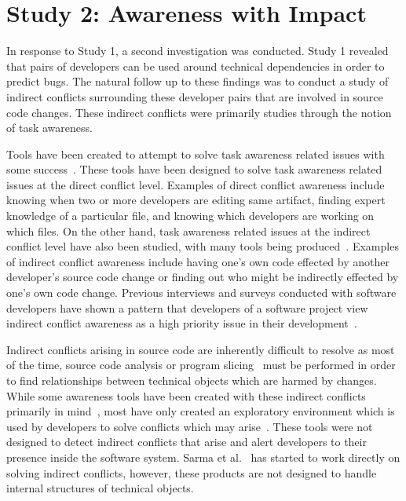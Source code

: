 \section{Study 2: Awareness with Impact}
\label{study:impact}

In response to Study 1, a second investigation was conducted. Study 1 revealed
that pairs of developers can be used around technical dependencies in order
to predict bugs. The natural follow up to these findings was to conduct a study
of indirect conflicts surrounding these developer pairs that are involved in 
source code changes. These indirect
conflicts were primarily studies through the notion of task awareness.

Tools have been created to attempt to solve task awareness related issues
with some success~\cite{Xiang:2008:ERT, Biehl:2007:FVD, Sarma:2009:TIV, Khurana:2009:PFC}. 
These tools have been designed 
to solve task awareness related issues at the direct conflict level. 
Examples of direct conflict awareness include knowing when two or more 
developers are  editing same artifact, finding expert knowledge of a
particular file, and knowing which developers are working on which files.
On the other hand, task awareness related issues at the indirect conflict level
have also been studied, with many tools being
produced~\cite{Sarma:2007:TSA,Servant:2010:CPI,Begel:2010:CDE,Trainer:2005:BGT}. 
Examples of indirect conflict awareness
include having one's own code effected by another developer's source
code change or finding out who might be indirectly effected by one's
own code change. Previous interviews and surveys conducted with software developers have 
shown a pattern that developers of a software project view indirect conflict 
awareness  as a high priority issue in their development~\cite{Damian:2007:GSE, 
Halverson:2006:DTV, Begel:2010:CDE, Schroter:2012:TTF}.

Indirect conflicts arising in source code are inherently
difficult to resolve as most of the time, source code analysis or
program slicing~\cite{Weiser:1982:PUS} must
be performed in order to find relationships between technical objects
which are harmed by changes.
While some awareness tools have been created with these indirect conflicts
primarily in mind~\cite{Begel:2010:CDE, Trainer:2005:BGT}, most have only 
created an exploratory environment which is used by developers to
solve conflicts which may arise~\cite{Servant:2010:CPI}. These tools were not designed to detect
indirect conflicts that arise and alert developers to their presence 
inside the software system. Sarma et al.~\cite{Sarma:2007:TSA} has started to work directly
on solving indirect conflicts, however, these products are not designed to handle
internal structures of technical objects.

